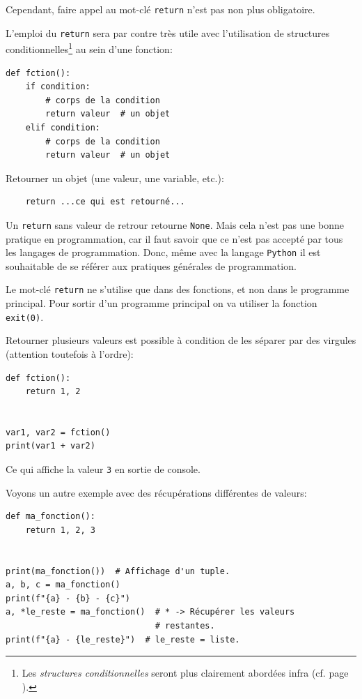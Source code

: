\documentclass[a4paper,12pt]{book}
\begin{document}
Cependant, faire appel au mot-clé \texttt{return} n'est pas non plus obligatoire.
\medskip

L'emploi du \texttt{return} sera par contre très utile avec l'utilisation de structures conditionnelles\footnote{Les \textit{structures conditionnelles} seront plus clairement abordées infra (cf. page \pageref{struct_cond}).} au sein d'une fonction:
\begin{lstlisting}[caption=Retours de fonction et structures conditionnelles]
def fction():
    if condition:
        # corps de la condition
        return valeur  # un objet
    elif condition:
        # corps de la condition
        return valeur  # un objet
\end{lstlisting}
\medskip

Retourner un objet (une valeur, une variable, etc.):
\begin{verbatim}
    return ...ce qui est retourné...
\end{verbatim}
\medskip

Un \texttt{return} sans valeur de retrour retourne \texttt{None}. Mais cela n'est pas une bonne pratique en programmation, car il faut savoir que ce n'est pas accepté par tous les langages de programmation. Donc, même avec la langage \texttt{Python} il est souhaitable de se référer aux pratiques générales de programmation.
\medskip

Le mot-clé \texttt{return} ne s'utilise que dans des fonctions, et non dans le programme principal. Pour sortir d'un programme principal on va utiliser la fonction \texttt{exit(0)}.
\medskip

Retourner plusieurs valeurs est possible à condition de les séparer par des virgules (attention toutefois à l'ordre):
\begin{lstlisting}[caption=Fonction retournant plusieurs objets]
def fction():
    return 1, 2


var1, var2 = fction()
print(var1 + var2)
\end{lstlisting}
\medskip

Ce qui affiche la valeur \texttt{3} en sortie de console.
\medskip

Voyons un autre exemple avec des récupérations différentes de valeurs:
\begin{lstlisting}[caption=Récupération de plusieurs valeurs de retour]
def ma_fonction():
    return 1, 2, 3


print(ma_fonction())  # Affichage d'un tuple.
a, b, c = ma_fonction()
print(f"{a} - {b} - {c}")
a, *le_reste = ma_fonction()  # * -> Récupérer les valeurs 
                              # restantes.
print(f"{a} - {le_reste}")  # le_reste = liste.
\end{lstlisting}
\medskip
\end{document}

